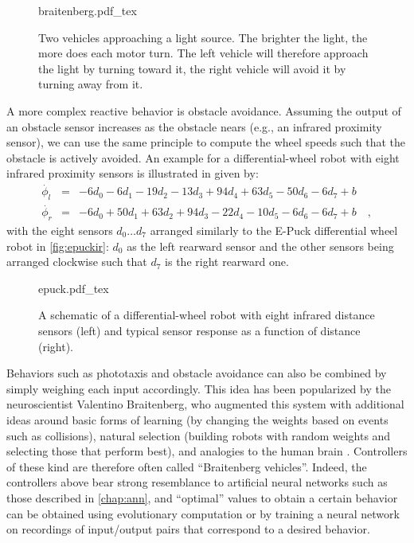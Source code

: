 \begin{figure}
    \centering
    \def\svgwidth{0.7\textwidth}
    {braitenberg.pdf_tex}
    \caption{Two vehicles approaching a light source. The brighter the light, the more does each motor turn. The left vehicle will therefore approach the light by turning toward it, the right vehicle will avoid it by turning away from it.\label{fig:braitenberg}}
\end{figure}

A more complex reactive behavior is obstacle avoidance. Assuming the output of an obstacle sensor increases as the obstacle nears (e.g., an infrared proximity sensor), we can use the same principle to compute the wheel speeds such that the obstacle is actively avoided. An example for a differential-wheel robot with eight infrared proximity sensors is illustrated in  given by:
\begin{eqnarray}
\nonumber
\dot{\phi_l}&=&-6d_0-6d_1-19d_2-13d_3+94d_4+63d_5-50d_6-6d_7+b\\
\nonumber
\dot{\phi_r}&=&-6d_0+50d_1+63d_2+94d_3-22d_4-10d_5-6d_6-6d_7+b \quad,
\end{eqnarray}
%
%
with the eight sensors $d_0 \ldots d_7$ arranged similarly to the E-Puck differential wheel robot in \cref{fig:epuckir}: $d_0$ as the left rearward sensor and the other sensors being arranged clockwise such that $d_7$ is the right rearward one.

\begin{figure}
    \centering
    \def\svgwidth{\textwidth}
    {epuck.pdf_tex}
    \caption{A schematic of a differential-wheel robot with eight infrared distance sensors (left) and typical sensor response as a function of distance (right).}
    \label{fig:epuck}
\end{figure}

Behaviors such as phototaxis and obstacle avoidance can also be combined by simply weighing each input accordingly. This idea has been popularized by the neuroscientist Valentino Braitenberg, who augmented this system with additional ideas around basic forms of learning (by changing the weights based on events such as collisions), natural selection (building robots with random weights and selecting those that perform best), and analogies to the human brain \cite{braitenberg1986vehicles}. Controllers of these kind are therefore often called ``Braitenberg vehicles''.
%
Indeed, the controllers above bear strong resemblance to artificial neural networks such as those described in \cref{chap:ann}, and ``optimal'' values to obtain a certain behavior can be obtained using evolutionary computation \cite{floreano1998evolutionary} or by training a neural network on recordings of input/output pairs that correspond to a desired behavior.

